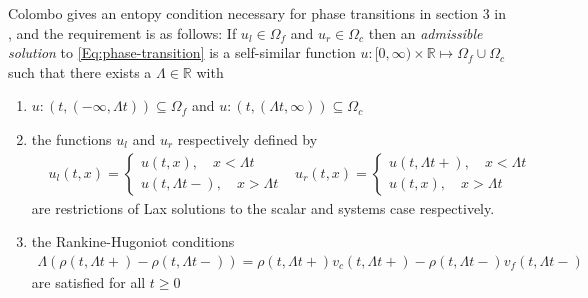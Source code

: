 \documentclass{article}
\numberwithin{equation}{section}
\begin{document}
Colombo gives an entopy condition necessary for phase transitions in section 3 in \cite{Colombo2003}, and the requirement is as follows: If $u_l \in \Omega_f$ and $u_r \in \Omega_c$ then an \textit{admissible solution} to \ref{Eq:phase-transition} is a self-similar function $u:[0, \infty) \times \mathbb{R} \mapsto \Omega_f \cup \Omega_c$ such that there exists a $\Lambda \in \mathbb{R}$ with 
\begin{enumerate}
    \item $u:(t, (-\infty,\Lambda t)) \subseteq \Omega_f $ and $u:(t, (\Lambda t, \infty)) \subseteq \Omega_c $ 
    \item the functions $u_l$ and $u_r$ respectively defined by \begin{align*}
        & u_l(t,x) = \begin{cases}
        u(t,x),  \quad x < \Lambda t\\
        u(t,\Lambda t-),\quad x > \Lambda t
        \end{cases}
        & u_r(t,x) = \begin{cases}
        u(t,\Lambda t+), \quad x < \Lambda t\\
        u(t,x), \quad x > \Lambda t
        \end{cases}
    \end{align*} are restrictions of Lax solutions to the scalar and systems case respectively. 
    \item the Rankine-Hugoniot conditions 
    \begin{align}
        \Lambda (\rho (t,\Lambda t+) - \rho (t,\Lambda t-)) = \rho (t,\Lambda t+) v_c(t,\Lambda t+) - \rho (t,\Lambda t-) v_f(t,\Lambda t-)
        \label{RH_PhT}
    \end{align} are satisfied for all $t \geq 0$
    
\end{enumerate}

\end{document}
